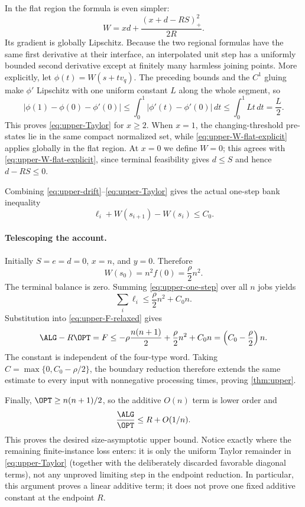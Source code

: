 In the flat region the formula is even simpler:
\begin{equation}
\label{eq:upper-W-flat-explicit}
 W=x d+\frac{(x+d-RS)_+^2}{2R}.
\end{equation}
Its gradient is globally Lipschitz.  Because the two regional formulas have
the same first derivative at their interface, an interpolated unit step has a
uniformly bounded second derivative except at finitely many harmless joining
points.  More explicitly, let $\phi(t)=W(s+t v_q)$.  The preceding bounds and
the $C^1$ gluing make $\phi'$ Lipschitz with one uniform constant $L$ along
the whole segment, so
\[
 \left|\phi(1)-\phi(0)-\phi'(0)\right|
 \le \int_0^1\left|\phi'(t)-\phi'(0)\right|\,dt
 \le \int_0^1 Lt\,dt=\frac L2.
\]
This proves \eqref{eq:upper-Taylor} for $x\ge2$.  When $x=1$, the
changing-threshold pre-states lie in the same compact normalized set, while
\eqref{eq:upper-W-flat-explicit} applies globally in the flat region.  At
$x=0$ we define $W=0$; this agrees with
\eqref{eq:upper-W-flat-explicit}, since terminal feasibility gives
$d\le S$ and hence $d-RS\le0$.

Combining \eqref{eq:upper-drift}--\eqref{eq:upper-Taylor} gives the actual
one-step bank inequality
\begin{equation}
\label{eq:upper-one-step}
 \ell_i+W(s_{i+1})-W(s_i)\le C_0.
\end{equation}

\paragraph{Telescoping the account.}
Initially $S=e=d=0$, $x=n$, and $y=0$.  Therefore
\begin{equation}
\label{eq:upper-W-initial}
 W(s_0)=n^2f(0)=\frac\rho2n^2.
\end{equation}
The terminal balance is zero.  Summing
\eqref{eq:upper-one-step} over all $n$ jobs yields
\[
 \sum_i\ell_i\le \frac\rho2n^2+C_0n.
\]
Substitution into \eqref{eq:upper-F-relaxed} gives
\[
 \ALG-R\OPT=F
 \le
 -\rho\frac{n(n+1)}2+\frac\rho2n^2+C_0n
 =\left(C_0-\frac\rho2\right)n.
\]
The constant is independent of the four-type word.  Taking
$C=\max\{0,C_0-\rho/2\}$, the boundary reduction therefore extends the same
estimate to every input with nonnegative processing times, proving
\cref{thm:upper}.

Finally, $\OPT\ge n(n+1)/2$, so the additive $O(n)$ term is lower order and
\[
 \frac{\ALG}{\OPT}\le R+O(1/n).
\]
This proves the desired size-asymptotic upper bound.  Notice exactly where the
remaining finite-instance loss enters: it is only the uniform Taylor
remainder in \eqref{eq:upper-Taylor} (together with the deliberately
discarded favorable diagonal terms), not any unproved limiting step in the
endpoint reduction.  In particular, this argument proves a linear additive
term; it does not prove one fixed additive constant at the endpoint $R$.
